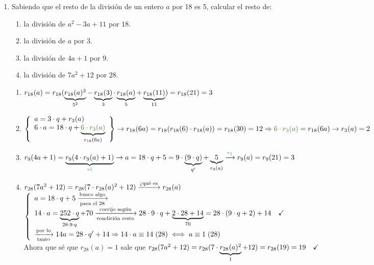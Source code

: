 \begin{enumerate}[label=\roman*)]
\begin{enumerate}[label=\roman*)]
	      \end{enumerate}
	\item


	      \ejercicio Sabiendo que el resto de la división de un entero $a$ por 18 es 5, calcular el resto de:
	      \begin{enumerate}[label=\roman*)]
		      \item la división de $a^2 -3a +11$ por 18.
		      \item la división de $a$ por 3.
		      \item la división de $4a+1$ por 9.
		      \item la división de $7a^2 + 12$ por 28.
	      \end{enumerate}
	      \separadorCorto
	      \begin{enumerate}[label=\roman*)]
		      \item $r_{18}(a) =
			            r_{18}( \underbrace{\textstyle r_{18}(a)^2}_{5^2} - \underbrace{\textstyle r_{18}(3)}_{3} \cdot \underbrace{\textstyle r_{18}(a)}_{5} + \underbrace{\textstyle r_{18}(11)}_{11} ) =
			            r_{18}(21) = 3 $

		            \separadorCorto

		      \item $
			            \llaves{l}{
				            a = 3 \cdot q + r_3(a)\\
				            6 \cdot a = 18 \cdot q + \ub{\green{6 \cdot r_3(a)}}{r_{18}(6a)}\\
			            } \to
			            r_{18}(6a) = r_{18}( r_{18}(6) \cdot r_{18}(a) ) = r_{18}(30) = 12\\
			            \entonces \green{6 \cdot r_3(a)} = r_{18}(6a) \to  r_3(a) = 2
		            $
		            \separadorCorto

		      \item $r_9(4a+1) = \ub{r_9(4 \cdot r_9(a) + 1)}{\blue{*1}} \to\\
			            a = 18 \cdot q + 5 = 9 \cdot \ub{( 9 \cdot q)}{q'} + \ub{5}{r_9(a)}
			            \flecha{\blue{*1}}
			            r_9(a) = r_9(21) = 3
		            $

		      \item
		            $r_{28}(7a^2 + 12) = r_{28}(7 \cdot r_{28}(a)^2 + 12) \flecha{¿qué es} r_{28}(a)$\\
		            $\llave{l}{
				            a = 18 \cdot q + 5 \flecha{busco algo}[para el 28]\\
				            14 \cdot a = \ub{252 \cdot q}{28 \cdot 9\cdot q } + 70
				            \flecha{corrijo según}[condición resto]
				            28 \cdot 9\cdot q + \ub{2\cdot28 +14}{70} = 28\cdot (9\cdot q + 2) + 14  \Tilde\\
				            \flecha{por lo}[tanto] 14a = 28\cdot q' + 14 \entonces \congruencia{14\cdot a}{14}{28} \sisolosi  \congruencia{a}{1}{28}
			            }$\\
		            Ahora que sé que $r_{28}(a) = 1$ sale que $r_{28}(7a^2 + 12) = r_{28}(7 \cdot \underbrace{\textstyle r_{28}(a)^2}_{1} + 12) = r_{28}(19)=19 \quad\checkmark$
	      \end{enumerate}


\end{enumerate}

